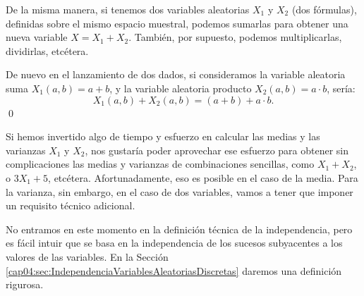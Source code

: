 De la misma manera, si tenemos dos variables aleatorias $X_1$ y $X_2$ (dos fórmulas), definidas sobre el mismo espacio muestral, podemos sumarlas para obtener una nueva variable $X=X_1+X_2$. También, por supuesto, podemos multiplicarlas, dividirlas, etcétera.
\begin{Ejemplo}
    De nuevo en el lanzamiento de dos dados, si consideramos la variable aleatoria suma $X_1(a,b)=a+b$, y la variable aleatoria producto $X_2(a,b)=a\cdot b$, sería:
    \[X_1(a,b)+X_2(a,b)=(a+b)+a\cdot b.\]
    \qed
\end{Ejemplo}
Si hemos invertido algo de tiempo y esfuerzo en calcular las medias y las varianzas $X_1$ y $X_2$, nos gustaría poder aprovechar ese esfuerzo para obtener sin complicaciones las medias y varianzas de combinaciones sencillas, como $X_1+X_2$, o $3X_1+5$, etcétera. Afortunadamente, eso es posible en el caso de la media. Para la varianza, sin embargo, en el caso de dos variables, vamos a tener que  imponer un requisito técnico adicional.
    \begin{center}
    \end{center}
No entramos en este momento en la definición técnica de la independencia, pero es fácil intuir que se basa en la independencia de los sucesos subyacentes a los valores de las variables. En la Sección \ref{cap04:sec:IndependenciaVariablesAleatoriasDiscretas} daremos una definición rigurosa.

